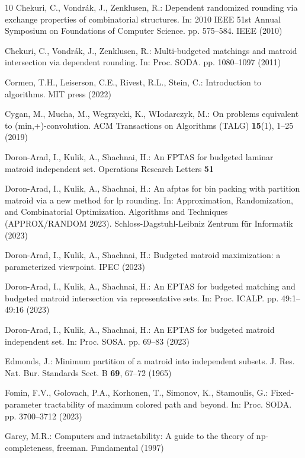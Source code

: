 \documentclass[11pt,letter]{article}
\begin{document}
\begin{thebibliography}{10}
Chekuri, C., Vondr{\'a}k, J., Zenklusen, R.: Dependent randomized rounding via
  exchange properties of combinatorial structures. In: 2010 IEEE 51st Annual
  Symposium on Foundations of Computer Science. pp. 575--584. IEEE (2010)

Chekuri, C., Vondr{\'a}k, J., Zenklusen, R.: Multi-budgeted matchings and
  matroid intersection via dependent rounding. In: Proc. SODA. pp. 1080--1097
  (2011)

Cormen, T.H., Leiserson, C.E., Rivest, R.L., Stein, C.: Introduction to
  algorithms. MIT press (2022)

Cygan, M., Mucha, M., Wegrzycki, K., WIodarczyk, M.: On problems equivalent to
  (min,+)-convolution. ACM Transactions on Algorithms (TALG)  \textbf{15}(1),
  1--25 (2019)

Doron-Arad, I., Kulik, A., Shachnai, H.: An {FPTAS} for budgeted laminar
  matroid independent set. Operations Research Letters  \textbf{51}

Doron-Arad, I., Kulik, A., Shachnai, H.: An afptas for bin packing with
  partition matroid via a new method for lp rounding. In: Approximation,
  Randomization, and Combinatorial Optimization. Algorithms and Techniques
  (APPROX/RANDOM 2023). Schloss-Dagstuhl-Leibniz Zentrum f{\"u}r Informatik
  (2023)

Doron-Arad, I., Kulik, A., Shachnai, H.: Budgeted matroid maximization: a
  parameterized viewpoint. IPEC  (2023)

Doron-Arad, I., Kulik, A., Shachnai, H.: An {EPTAS} for budgeted matching and
  budgeted matroid intersection via representative sets. In: Proc. {ICALP}. pp.
  49:1--49:16 (2023)

Doron-Arad, I., Kulik, A., Shachnai, H.: An {EPTAS} for budgeted matroid
  independent set. In: Proc. SOSA. pp. 69--83 (2023)

Edmonds, J.: Minimum partition of a matroid into independent subsets. J. Res.
  Nat. Bur. Standards Sect. B  \textbf{69},  67--72 (1965)

Fomin, F.V., Golovach, P.A., Korhonen, T., Simonov, K., Stamoulis, G.:
  Fixed-parameter tractability of maximum colored path and beyond. In: Proc.
  SODA. pp. 3700--3712 (2023)

Garey, M.R.: Computers and intractability: A guide to the theory of
  np-completeness, freeman. Fundamental  (1997)


\end{thebibliography}
\end{document}
